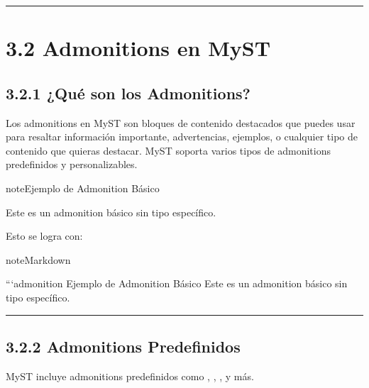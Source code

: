 \documentclass[a4paper,10pt,spanish]{sphinxmanual}
\begin{document}
\bigskip\hrule\bigskip


\sphinxstepscope


\section{3.2 Admonitions en MyST}
\label{\detokenize{3_guia_myst/advertencias:admonitions-en-myst}}\label{\detokenize{3_guia_myst/advertencias::doc}}

\subsection{3.2.1 ¿Qué son los Admonitions?}
\label{\detokenize{3_guia_myst/advertencias:que-son-los-admonitions}}
\sphinxAtStartPar
Los admonitions en MyST son bloques de contenido destacados que puedes usar para resaltar información importante, advertencias, ejemplos, o cualquier tipo de contenido que quieras destacar. MyST soporta varios tipos de admonitions predefinidos y personalizables.

\begin{sphinxadmonition}{note}{Ejemplo de Admonition Básico}

\sphinxAtStartPar
Este es un admonition básico sin tipo específico.
\end{sphinxadmonition}

\sphinxAtStartPar
Esto se logra con:

\begin{sphinxadmonition}{note}{Markdown}

\begin{sphinxVerbatim}[commandchars=\\\{\}]
```\PYGZob{}admonition\PYGZcb{} Ejemplo de Admonition Básico
Este es un admonition básico sin tipo específico.
\end{sphinxVerbatim}
\end{sphinxadmonition}


\bigskip\hrule\bigskip



\subsection{3.2.2 Admonitions Predefinidos}
\label{\detokenize{3_guia_myst/advertencias:admonitions-predefinidos}}
\sphinxAtStartPar
MyST incluye admonitions predefinidos como , , , y más.
\end{document}
